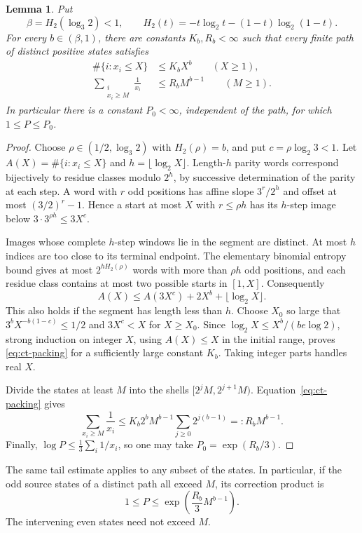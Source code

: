 \documentclass[11pt,a4paper]{article}
\newtheorem{lemma}[theorem]{Lemma}
\begin{document}
\begin{lemma}\label{lem:ct-packing}
Put
\[
 \beta=H_2(\log_3 2)<1,\qquad
 H_2(t)=-t\log_2t-(1-t)\log_2(1-t).
\]
For every \(b\in(\beta,1)\), there are constants \(K_b,R_b<\infty\)
such that every finite path of distinct positive states satisfies
\begin{align}
 \#\{i:x_i\le X\}&\le K_bX^b\qquad(X\ge1),\label{eq:ct-packing}\\
 \sum_{\substack{i\\x_i\ge M}}\frac1{x_i}
     &\le R_bM^{b-1}\qquad(M\ge1).\label{eq:ct-packing-tail}
\end{align}
In particular there is a constant \(P_0<\infty\), independent of
the path, for which \(1\le P\le P_0\).
\end{lemma}
\begin{proof}
Choose \(\rho\in(1/2,\log_3 2)\) with \(H_2(\rho)=b\), and put
\(c=\rho\log_2 3<1\). Let
\(A(X)=\#\{i:x_i\le X\}\) and \(h=\lfloor\log_2X\rfloor\).
Length-\(h\) parity words correspond bijectively to residue classes
modulo \(2^h\), by successive determination of the parity at each
step. A word with \(r\) odd positions has affine slope
\(3^r/2^h\) and offset at most \((3/2)^r-1\). Hence a start at
most \(X\) with \(r\le\rho h\) has its \(h\)-step image below
\(3\cdot3^{\rho h}\le3X^c\).

Images whose complete \(h\)-step windows lie in the segment are
distinct. At most \(h\) indices are too close to its terminal
endpoint. The elementary binomial entropy bound gives at most
\(2^{hH_2(\rho)}\) words with more than \(\rho h\) odd positions,
and each residue class contains at most two possible starts in
\([1,X]\). Consequently
\[
 A(X)\le A(3X^c)+2X^b+\lfloor\log_2X\rfloor.
\]
This also holds if the segment has length less than \(h\).
Choose \(X_0\) so large that
\(3^bX^{-b(1-c)}\le1/2\) and \(3X^c<X\) for \(X\ge X_0\).
Since
\(\log_2X\le X^b/(be\log2)\), strong induction on integer \(X\),
using \(A(X)\le X\) in the initial range, proves
\eqref{eq:ct-packing} for a sufficiently large constant \(K_b\).
Taking integer parts handles real \(X\).

Divide the states at least \(M\) into the shells
\([2^jM,2^{j+1}M)\). Equation~\eqref{eq:ct-packing} gives
\[
 \sum_{x_i\ge M}\frac1{x_i}
 \le K_b2^bM^{b-1}\sum_{j\ge0}2^{j(b-1)}
 =:R_bM^{b-1}.
\]
Finally, \(\log P\le\frac13\sum_i1/x_i\), so one may take
\(P_0=\exp(R_b/3)\).
\end{proof}

The same tail estimate applies to any subset of the states.
In particular, if the odd source states of a distinct path all
exceed \(M\), its correction product is
\begin{equation}\label{eq:ct-prefix-product}
 1\le P\le\exp\!\left(\frac{R_b}{3}M^{b-1}\right).
\end{equation}
The intervening even states need not exceed \(M\).
\end{document}
